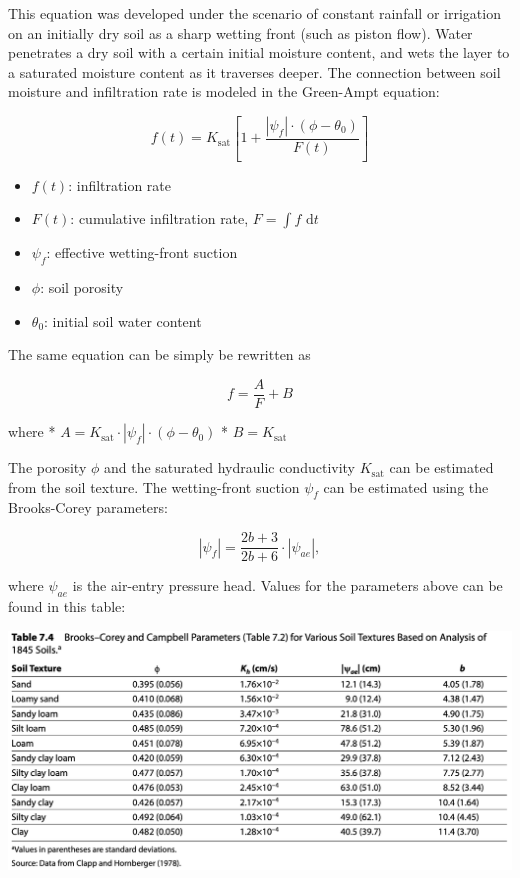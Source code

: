 \documentclass[
  letterpaper,
  DIV=11,
  numbers=noendperiod]{scrreprt}
\providecommand{\tightlist}{%
  \setlength{\itemsep}{0pt}\setlength{\parskip}{0pt}}\usepackage{longtable,booktabs,array}
\begin{document}
This equation was developed under the scenario of constant rainfall or
irrigation on an initially dry soil as a sharp wetting front (such as
piston flow). Water penetrates a dry soil with a certain initial
moisture content, and wets the layer to a saturated moisture content as
it traverses deeper. The connection between soil moisture and
infiltration rate is modeled in the Green-Ampt equation:

\[
f(t) = K_\text{sat}
\left[
1 + \frac{|\psi_f|\cdot \left( \phi - \theta_0 \right)}{F(t)}
\right]
\]

\begin{itemize}
\tightlist
\item
  \(f(t)\): infiltration rate
\item
  \(F(t)\): cumulative infiltration rate, \(F=\int\! f \text{ d}t\)
\item
  \(\psi_f\): effective wetting-front suction
\item
  \(\phi\): soil porosity
\item
  \(\theta_0\): initial soil water content
\end{itemize}

The same equation can be simply be rewritten as

\[f = \frac{A}{F} + B\]

where *
\(A = K_\text{sat}\cdot|\psi_f|\cdot \left( \phi - \theta_0 \right)\) *
\(B= K_\text{sat}\)

The porosity \(\phi\) and the saturated hydraulic conductivity
\(K_\text{sat}\) can be estimated from the soil texture. The
wetting-front suction \(\psi_f\) can be estimated using the Brooks-Corey
parameters:

\[
|\psi_f| = \frac{2b+3}{2b+6}\cdot |\psi_{ae}|,
\]

where \(\psi_{ae}\) is the air-entry pressure head. Values for the
parameters above can be found in this table:

\includegraphics{archive/figures/dingman_table7.4.png}
\end{document}
